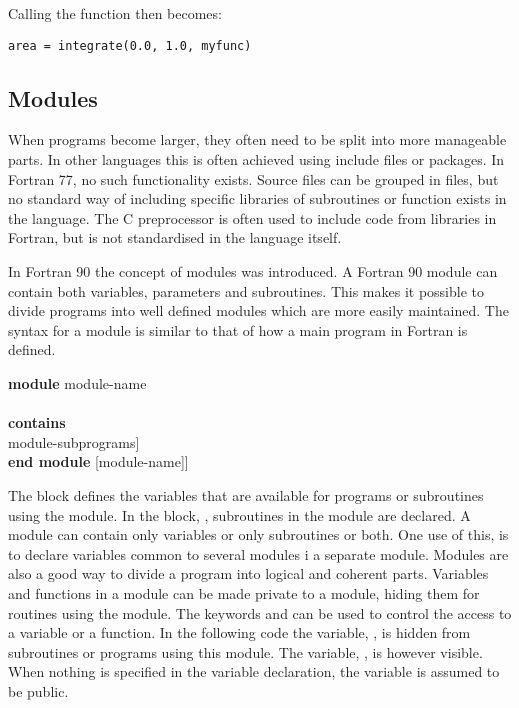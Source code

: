Calling the  function then becomes:

\begin{lstlisting}
area = integrate(0.0, 1.0, myfunc)
\end{lstlisting}





\subsection{Modules}

When programs become larger, they often need to be split into more manageable parts. In other languages this is often achieved using include files or packages. In Fortran 77, no such functionality exists. Source files can be grouped in files, but no standard way of including specific libraries of subroutines or function exists in the language. The C preprocessor is often used to include code from libraries in Fortran, but is not standardised in the language itself. 

In Fortran 90 the concept of modules was introduced. A Fortran 90 module can contain both variables, parameters and subroutines. This makes it possible to divide programs into well defined modules which are more easily maintained. The syntax for a module is similar to that of how a main program in Fortran is defined.

\begin{fsyntax}
\textbf{module} module-name \\
 \\
\protect{[}\textbf{contains} \\
\ftab module-subprograms] \\
\textbf{end module} [module-name]]
\end{fsyntax}

The block  defines the variables that are available for programs or subroutines using the module. In the block, , subroutines in the module are declared. A module can contain only variables or only subroutines or both. One use of this, is to declare variables common to several modules i a separate module. Modules are also a good way to divide a program into logical and coherent parts. Variables and functions in a module can be made private to a module, hiding them for routines using the module. The keywords  and  can be used to control the access to a variable or a function. In the following code the variable, , is hidden from subroutines or programs using this module. The variable, , is however visible. When nothing is specified in the variable declaration, the variable is assumed to be public.

